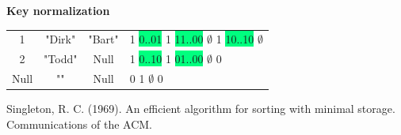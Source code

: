 \documentclass[usenames,dvipsnames, 18pt, compress, aspectratio=169]{beamer}
\begin{document}
\begin{frame}[fragile]{}
    \frametitle{}

    \begin{center}
    \textbf{Key normalization}
    \vspace{1cm}

    \begin{tabular}{cccl}
        1 & "Dirk" & "Bart" &
            \colorbox{BurntOrange}{1}
            \colorbox{SpringGreen}{0..01}
            \colorbox{BurntOrange}{1}
            \colorbox{SpringGreen}{11..00}
            \colorbox{Gray!40}{$\emptyset$}
            \colorbox{BurntOrange}{1}
            \colorbox{SpringGreen}{10..10}
            \colorbox{Gray!40}{$\emptyset$} \\
        2 & "Todd" & Null &
            \colorbox{BurntOrange}{1}
            \colorbox{SpringGreen}{0..10}
            \colorbox{BurntOrange}{1}
            \colorbox{SpringGreen}{01..00}
            \colorbox{Gray!40}{$\emptyset$}
            \colorbox{BurntOrange}{0} \\
        Null & "" & Null &
            \colorbox{BurntOrange}{0}
            \colorbox{BurntOrange}{1}
            \colorbox{Gray!40}{$\emptyset$}
            \colorbox{BurntOrange}{0} \\
    \end{tabular}

    \linespread{0.5}
    \vspace{0.5cm}
    \color{black}\fontsize{6pt}{0}\selectfont
        Singleton, R. C. (1969). An efficient algorithm for sorting with minimal storage. \\
        Communications of the ACM.
    \linespread{1.5}

    \end{center}
\end{frame}
\end{document}
